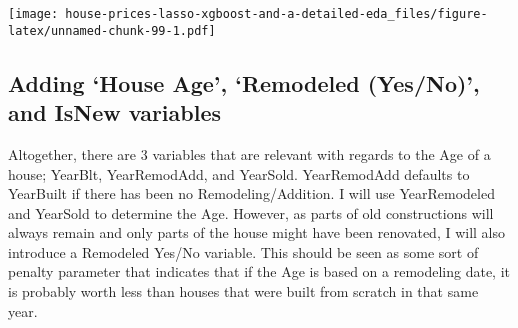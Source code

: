 \documentclass[]{article}
\newenvironment{Shaded}{\begin{snugshade}}{\end{snugshade}}
\newcommand{\KeywordTok}[1]{\textcolor[rgb]{0.13,0.29,0.53}{\textbf{#1}}}
\newcommand{\DataTypeTok}[1]{\textcolor[rgb]{0.13,0.29,0.53}{#1}}
\newcommand{\DecValTok}[1]{\textcolor[rgb]{0.00,0.00,0.81}{#1}}
\newcommand{\StringTok}[1]{\textcolor[rgb]{0.31,0.60,0.02}{#1}}
\newcommand{\CommentTok}[1]{\textcolor[rgb]{0.56,0.35,0.01}{\textit{#1}}}
\newcommand{\OtherTok}[1]{\textcolor[rgb]{0.56,0.35,0.01}{#1}}
\newcommand{\OperatorTok}[1]{\textcolor[rgb]{0.81,0.36,0.00}{\textbf{#1}}}
\newcommand{\NormalTok}[1]{#1}
\begin{document}
\texttt{[image: house-prices-lasso-xgboost-and-a-detailed-eda\_files/figure-latex/unnamed-chunk-99-1.pdf]}

\subsection{\texorpdfstring{Adding `House Age', `Remodeled (Yes/No)',
and IsNew
variables}{Adding House Age, Remodeled (Yes/No), and IsNew variables}}\label{adding-house-age-remodeled-yesno-and-isnew-variables}

Altogether, there are 3 variables that are relevant with regards to the
Age of a house; YearBlt, YearRemodAdd, and YearSold. YearRemodAdd
defaults to YearBuilt if there has been no Remodeling/Addition. I will
use YearRemodeled and YearSold to determine the Age. However, as parts
of old constructions will always remain and only parts of the house
might have been renovated, I will also introduce a Remodeled Yes/No
variable. This should be seen as some sort of penalty parameter that
indicates that if the Age is based on a remodeling date, it is probably
worth less than houses that were built from scratch in that same year.

\begin{Shaded}
\end{Shaded}

\begin{Shaded}
\end{Shaded}
\end{document}
